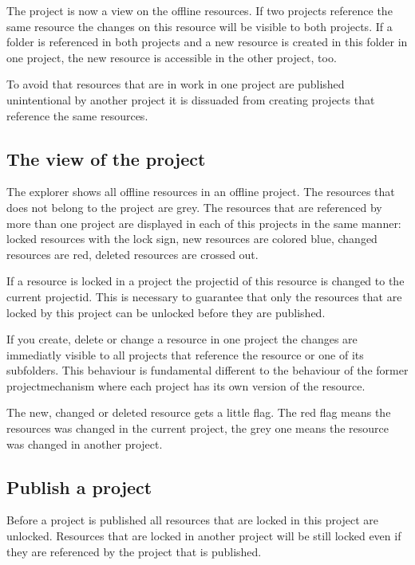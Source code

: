 The project is now a view on the offline resources. If two
projects reference the same resource the changes on this resource
will be visible to both projects. If a folder is referenced in
both projects and a new resource is created in this folder in one
project, the new resource is accessible in the other project, too.

To avoid that resources that are in work in one project are
published unintentional by another project it is dissuaded from
creating projects that reference the same resources.

\subsection{The view of the project}

The explorer shows all offline resources in an offline project.
The resources that does not belong to the project are grey. The
resources that are referenced by more than one project are
displayed in each of this projects in the same manner: locked
resources with the lock sign, new resources are colored blue,
changed resources are red, deleted resources are crossed out.

If a resource is locked in a project the projectid of this
resource is changed to the current projectid. This is necessary to
guarantee that only the resources that are locked by this project
can be unlocked before they are published.

If you create, delete or change a resource in one project the
changes are immediatly visible to all projects that reference the
resource or one of its subfolders. This behaviour is fundamental
different to the behaviour of the former projectmechanism where
each project has its own version of the resource.

The new, changed or deleted resource gets a little flag. The red
flag means the resources was changed in the current project, the
grey one means the resource was changed in another project.

\subsection{Publish a project}

Before a project is published all resources that are locked in
this project are unlocked. Resources that are locked in another
project will be still locked even if they are referenced by the
project that is published.

